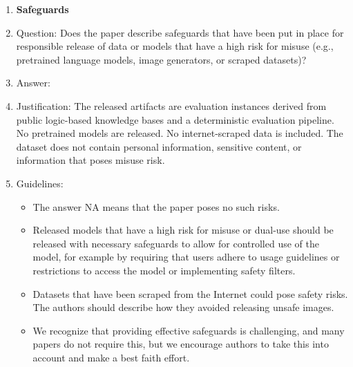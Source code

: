 \documentclass{article}
\theoremstyle{definition}
\begin{document}
\begin{enumerate}
\item {\bf Safeguards}
    \item[] Question: Does the paper describe safeguards that have been put in place for responsible release of data or models that have a high risk for misuse (e.g., pretrained language models, image generators, or scraped datasets)?
    \item[] Answer: \answerNA{}
    \item[] Justification: The released artifacts are evaluation instances derived from public logic-based knowledge bases and a deterministic evaluation pipeline. No pretrained models are released. No internet-scraped data is included. The dataset does not contain personal information, sensitive content, or information that poses misuse risk.
    \item[] Guidelines:
    \begin{itemize}
        \item The answer NA means that the paper poses no such risks.
        \item Released models that have a high risk for misuse or dual-use should be released with necessary safeguards to allow for controlled use of the model, for example by requiring that users adhere to usage guidelines or restrictions to access the model or implementing safety filters. 
        \item Datasets that have been scraped from the Internet could pose safety risks. The authors should describe how they avoided releasing unsafe images.
        \item We recognize that providing effective safeguards is challenging, and many papers do not require this, but we encourage authors to take this into account and make a best faith effort.
    \end{itemize}


\end{enumerate}
\end{document}
